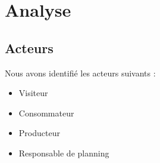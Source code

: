 \documentclass[12pt]{report}
\begin{document}

\section{Analyse}

\subsection{Acteurs}
Nous avons identifié les acteurs suivants :
\begin{itemize}
\item Visiteur
\item Consommateur
\item Producteur
\item Responsable de planning
\end{itemize}
\clearpage
\end{document}
